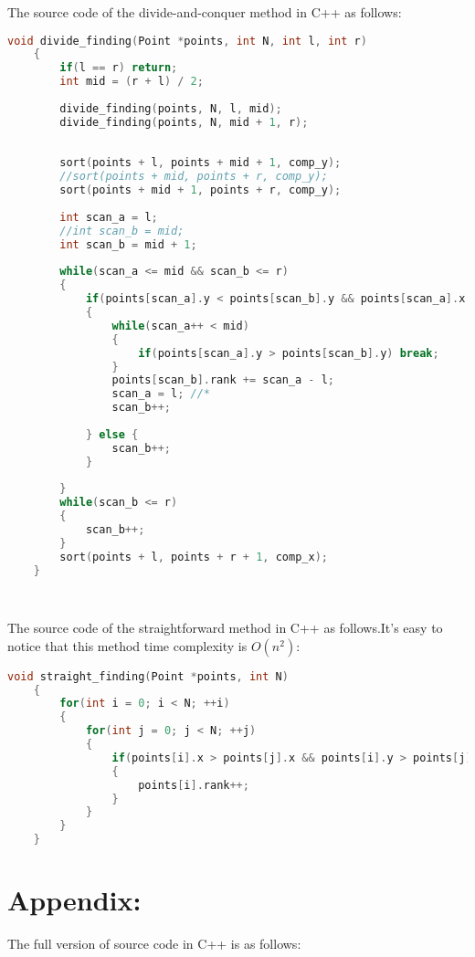 \documentclass{article}
\begin{document}
	\newpage
	The source code of the divide-and-conquer method in C++ as follows:\\
	

	\begin{lstlisting}[language={C++},breaklines=true]
	void divide_finding(Point *points, int N, int l, int r) 
	{
	    if(l == r) return;
	    int mid = (r + l) / 2;
	
	    divide_finding(points, N, l, mid);
	    divide_finding(points, N, mid + 1, r);
	
	
	    sort(points + l, points + mid + 1, comp_y);
	    //sort(points + mid, points + r, comp_y);
	    sort(points + mid + 1, points + r, comp_y);
	
	    int scan_a = l;
	    //int scan_b = mid;
	    int scan_b = mid + 1;
	
	    while(scan_a <= mid && scan_b <= r) 
	    {
	        if(points[scan_a].y < points[scan_b].y && points[scan_a].x < points[scan_b].x) 
	        {
	            while(scan_a++ < mid)
	            {
	                if(points[scan_a].y > points[scan_b].y) break;
	            }
	            points[scan_b].rank += scan_a - l;
	            scan_a = l; //*
	            scan_b++;
	
	        } else {
	            scan_b++;
	        }
	
	    }
	    while(scan_b <= r) 
	    {
	        scan_b++;
	    }
	    sort(points + l, points + r + 1, comp_x);
	}

	
	\end{lstlisting}
	\newpage
	The source code of the straightforward method in C++ as follows.It's easy to notice that this method time complexity is $O(n^2)$:\\
	\begin{lstlisting}[language={C++},breaklines=true]
	void straight_finding(Point *points, int N)
	{
	    for(int i = 0; i < N; ++i)
	    {
	        for(int j = 0; j < N; ++j)
	        {
	            if(points[i].x > points[j].x && points[i].y > points[j].y)
	            {
	                points[i].rank++;
	            }
	        }
	    }	
	}		
	\end{lstlisting}	
	
	\section{Appendix:}
	The full version of source code in C++ is as follows:
	\newcommand{\dq}{"}
\end{document}
